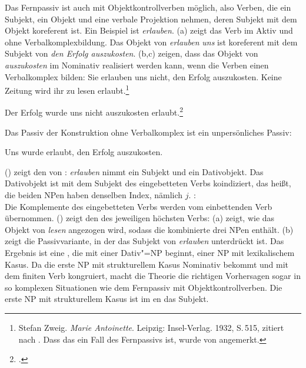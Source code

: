 Das Fernpassiv ist auch mit Objektkontrollverben möglich, also Verben, die ein Subjekt,
ein Objekt und eine verbale Projektion nehmen, deren Subjekt mit dem Objekt koreferent ist. Ein Beispiel
ist \emph{erlauben}. (a) zeigt das Verb im Aktiv und ohne Verbalkomplexbildung. Das Objekt von \emph{erlauben} \emph{uns} ist koreferent mit dem
Subjekt von \emph{den Erfolg auszukosten}. (b,c) zeigen, dass das Objekt
von \emph{auszukosten} im Nominativ realisiert werden kann, wenn die Verben einen Verbalkomplex bilden:
\eal
\label{bsp-auskosten-fernpassiv}
\ex 
Sie erlauben uns nicht, den Erfolg auszukosten.
\ex{}
Keine Zeitung          wird   ihr       zu lesen erlaubt.\footnote{
        Stefan Zweig. \emph{Marie Antoinette}. Leipzig: Insel-Verlag. 1932, S.\,515,
        zitiert nach .
        Dass das ein Fall des Fernpassivs ist, wurde von \citet[]{Askedal88} angemerkt.
}

\ex{}
Der Erfolg         wurde  uns       nicht auszukosten erlaubt.\footnote{
        .%
}

\label{bsp-auskosten-fernpassiv-haider}
\zl

\noindent
Das Passiv der Konstruktion ohne Verbalkomplex ist ein unpersönliches Passiv:

\ea
Uns       wurde  erlaubt, den        Erfolg  auszukosten.
\z

\noindent
() zeigt den \argstw von : \emph{erlauben} nimmt ein Subjekt und ein Dativobjekt. Das Dativobjekt ist mit dem Subjekt des eingebetteten Verbs koindiziert, das heißt, die beiden NPen
haben denselben Index, nämlich $j$.
\ea
{}:\\
\z
Die Komplemente des eingebetteten Verbs  werden vom einbettenden Verb übernommen. () zeigt
den \argstw des jeweiligen höchsten Verbs:
\ea
\label{ex-arg-st-fernpassiv-object-control}
\z
(a) zeigt, wie das Objekt von \emph{lesen} angezogen wird, sodass die kombinierte \argst
drei NPen enthält. (b) zeigt die Passivvariante, in der das Subjekt von \emph{erlauben}
unterdrückt ist. Das Ergebnis ist eine \argstl, die mit einer Dativ"=NP beginnt, einer NP mit lexikalischem Kasus. Da die
erste NP mit strukturellem Kasus Nominativ bekommt und mit dem finiten Verb kongruiert, macht die Theorie die
richtigen Vorhersagen sogar in so komplexen Situationen wie dem Fernpassiv mit Objektkontrollverben. Die
erste NP mit strukturellem Kasus ist im en das Subjekt.

